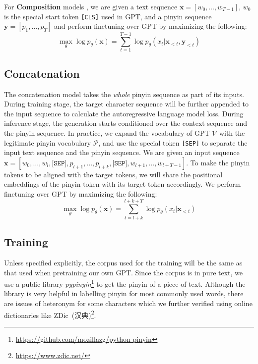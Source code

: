 For \textbf{Composition} models , we are given a text sequence $\mathbf{x} = [w_0,\dots,w_{T-1}]$, $w_0$ is the special start token \texttt{[CLS]} used in GPT, and a pinyin sequence $\mathbf{y} = [p_1,\dots,p_T]$ and perform finetuning over GPT by maximizing the following:
\begin{equation}
    \max_{\theta} \log p_{\theta}(\mathbf{x}) = \sum_{t=1}^{T-1}\log p_{\theta}(x_t|\mathbf{x}_{<t},\mathbf{y}_{<t})
\end{equation}

\subsection{Concatenation} 
The concatenation model takes the \textit{whole} pinyin sequence as part of its inputs. 
During training stage, the target character sequence will be further appended to the input sequence to calculate the autoregressive language model loss.
During inference stage, the generation starts conditioned over the context sequence and the pinyin sequence.
In practice, we expand the vocabulary of GPT $\mathcal{V}$ with the legitimate pinyin vocabulary $\mathcal{P}$, and use the special token \texttt{[SEP]} to separate the input text sequence and the pinyin sequence.
We are given an input sequence $\mathbf{x} = [w_0,\dots,w_l,\texttt{[SEP]},p_{l+1},\dots,p_{l+k},\texttt{[SEP]},w_{l+1},\allowbreak \dots,w_{l+T-1}]$.
To make the pinyin tokens to be aligned with the target tokens, we will share the positional embeddings of the pinyin token with its target token accordingly.
We perform finetuning over GPT by maximizing the following:
\begin{equation}
    \max_{\theta} \log p_{\theta}(\mathbf{x}) = \sum_{t=l+k}^{l + k+ T}\log p_{\theta}(x_t|\mathbf{x}_{<t})
\end{equation}

\subsection{Training}
\label{sec:training}

Unless specified explicitly, the corpus used for the training will be the same as that used when pretraining our own GPT.
Since the corpus is in pure text, we use a public library \textit{pypinyin}\footnote{\url{https://github.com/mozillazg/python-pinyin}} to get the pinyin of a piece of text.
Although the library is very helpful in labelling pinyin for most commonly used words, there are issues of heteronym for some characters which we further verified using online dictionaries like ZDic~(汉典)\footnote{\url{https://www.zdic.net/}}.

